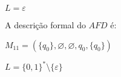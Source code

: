 \documentclass{article}
\begin{document}
\begin{prob}
  $L = {\varepsilon}$

  \begin{center}
  \end{center}

  A descrição formal do $AFD$ é:
  \begin{center}
    $M_{11} = (\{q_{0}\}, \varnothing,\varnothing,q_{0}, \{q_0\})$
  \end{center}
\end{prob}

\begin{prob}
  $L = \{0, 1\}^{*} \setminus \{\varepsilon\}$


\end{prob}
\end{document}
